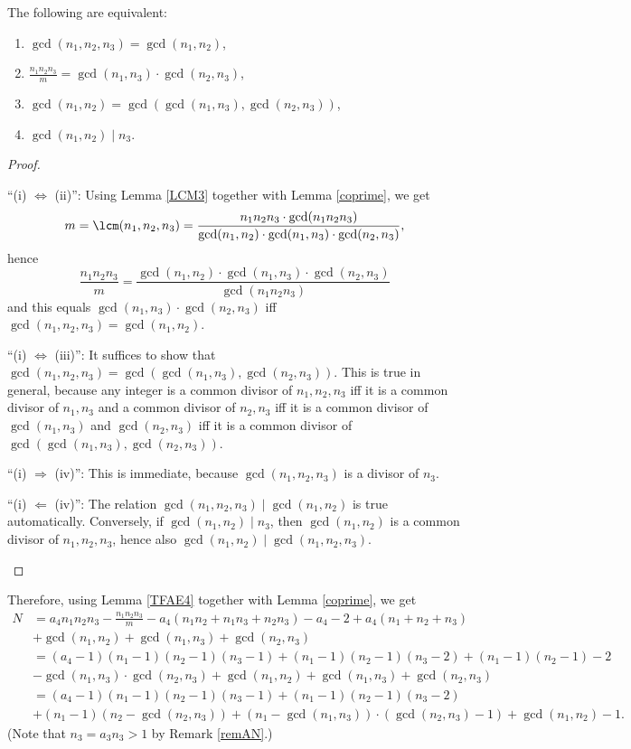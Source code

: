 \begin{lemma}\label{TFAE4}
The following are equivalent:
\begin{enumerate}[label={\upshape(\roman*)}]
\item $\gcd(n_1,n_2,n_3)=\gcd(n_1,n_2)$,
\item $\frac{n_1n_2n_3}{m}=\gcd(n_1,n_3)\cdot \gcd(n_2,n_3)$,
\item $\gcd(n_1,n_2)=\gcd(\gcd(n_1,n_3),\gcd(n_2,n_3))$,
\item $\gcd(n_1,n_2) \mid n_3$.
\end{enumerate}
\end{lemma}
\begin{proof}
\leavevmode
\begin{DESCRIPTION}%
\item[\enquote{(i) $\Leftrightarrow$ (ii)}:] Using Lemma \ref{LCM3} together with Lemma \ref{coprime}, we get 
$$m=\lcm(n_1,n_2,n_3)=\frac{n_1n_2n_3\cdot \gcd(n_1n_2n_3)}{\gcd(n_1,n_2)\cdot \gcd(n_1,n_3)\cdot\gcd(n_2,n_3)},$$
hence $$\frac{n_1n_2n_3}{m}=\frac{\gcd(n_1,n_2)\cdot \gcd(n_1,n_3)\cdot\gcd(n_2,n_3)}{\gcd(n_1n_2n_3)}$$
and this equals $\gcd(n_1,n_3)\cdot\gcd(n_2,n_3)$ iff $\gcd(n_1,n_2,n_3)=\gcd(n_1,n_2)$.
\item[\enquote{(i) $\Leftrightarrow$ (iii)}:] It suffices to show that $\gcd(n_1,n_2,n_3)=\gcd(\gcd(n_1,n_3),\gcd(n_2,n_3))$. This is true in general, because any integer is a common divisor of $n_1,n_2,n_3$ iff it is a common divisor of $n_1,n_3$ and a common divisor of $n_2,n_3$ iff it is a common divisor of $\gcd(n_1,n_3)$ and $\gcd(n_2,n_3)$ iff it is a common divisor of $\gcd(\gcd(n_1,n_3),\gcd(n_2,n_3))$.
\item[\enquote{(i) $\Rightarrow$ (iv)}:] This is immediate, because $\gcd(n_1,n_2,n_3)$ is a divisor of $n_3$.
\item[\enquote{(i) $\Leftarrow$ (iv)}:] The relation $\gcd(n_1,n_2,n_3) \mid \gcd(n_1,n_2)$ is true automatically. Conversely, if $\gcd(n_1,n_2) \mid n_3$, then $\gcd(n_1,n_2)$ is a common divisor of $n_1,n_2,n_3$, hence also $\gcd(n_1,n_2) \mid \gcd(n_1,n_2,n_3)$.
\end{DESCRIPTION}
\end{proof}

Therefore, using Lemma \ref{TFAE4} together with Lemma \ref{coprime}, we get
\begin{align*}
N&=a_4n_1n_2n_3-\frac{n_1n_2n_3}{m}-a_4(n_1n_2+n_1n_3+n_2n_3)-a_4-2+a_4(n_1+n_2+n_3)\\
&+\gcd(n_1,n_2)+\gcd(n_1,n_3)+\gcd(n_2,n_3)\\
&=(a_4-1)(n_1-1)(n_2-1)(n_3-1)+(n_1-1)(n_2-1)(n_3-2)+(n_1-1)(n_2-1)-2\\
&-\gcd(n_1,n_3)\cdot\gcd(n_2,n_3)+\gcd(n_1,n_2)+\gcd(n_1,n_3)+\gcd(n_2,n_3)\\
&=(a_4-1)(n_1-1)(n_2-1)(n_3-1)+(n_1-1)(n_2-1)(n_3-2)\\
&+(n_1-1)(n_2-\gcd(n_2,n_3))+(n_1-\gcd(n_1,n_3))\cdot(\gcd(n_2,n_3)-1)+\gcd(n_1,n_2)-1.
\end{align*}
(Note that $n_3=a_3n_3>1$ by Remark \ref{remAN}.)

